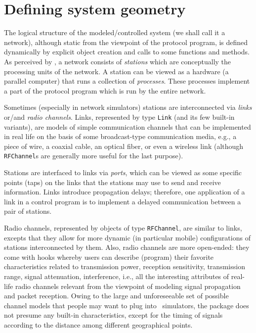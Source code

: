 \section{Defining system geometry}
\label{rm_to}

The logical structure of the modeled/controlled
system (we shall call it a network), although static from the viewpoint
of the protocol program, is defined dynamically by explicit object creation
and calls to some functions and methods.
As perceived by \smurph, a network consists of {\em stations\/} which are
conceptually the processing units of the network.
A station can be viewed as a hardware
(a parallel computer) that runs a collection of {\em processes}.
These processes implement a part of the protocol program which is run by
the entire network.

Sometimes (especially in network simulators) stations
are interconnected via {\em links\/} or/and {\em radio channels}.
Links, represented by type {\tt Link} (and its few built-in variants),
are models of
simple communication channels that can be implemented in real life
on the basis of some broadcast-type communication media, e.g.,
a piece of wire, a coaxial cable, an optical fiber, or even a wireless link
(although {\tt RFChannel}s are generally more useful for the last purpose).

Stations are interfaced to links via {\em ports},
which can be viewed as some specific points (taps) on the links
that the stations may use to send and receive information.
Links introduce propagation delays; therefore, one application of a link
in a control program is to implement a delayed communication between a pair
of stations.

Radio channels, represented by objects of type {\tt RFChannel}, are similar
to links, excepts that they allow for more dynamic (in particular mobile)
configurations of stations interconnected by them.
Also, radio channels are more open-ended: they come with hooks whereby users
can describe (program)
their favorite characteristics related to
transmission power, reception sensitivity, transmission
range, signal attenuation, interference, i.e., all the interesting attributes
of real-life radio channels relevant from the viewpoint of modeling signal
propagation and packet reception.
Owing to the large and unforeseeable set of possible channel models that
people may want to plug into \smurph\ simulators, the package does not
presume any built-in characteristics, except for the timing of signals
according to the distance among different geographical points.

